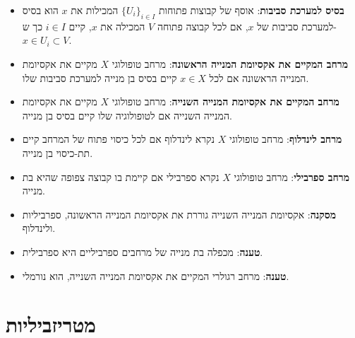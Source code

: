 \documentclass{tstextbook}
\begin{document}
\begin{summary}
  \begin{itemize}
    \item \textbf{בסיס למערכת סביבות}: אוסף של קבוצות פתוחות \(\{U_i\}_{i \in I}\) המכילות את \(x\) הוא בסיס למערכת סביבות של \(x\), אם לכל קבוצה פתוחה \(V\) המכילה את \(x\), קיים \(i \in I\) כך ש-\(x \in U_i \subset V\).
    \item \textbf{מרחב המקיים את אקסיומת המנייה הראשונה}: מרחב טופולוגי \(X\) מקיים את אקסיומת המנייה הראשונה אם לכל \(x \in X\) קיים בסיס בן מנייה למערכת סביבות שלו.
    \item \textbf{מרחב המקיים את אקסיומת המנייה השנייה}: מרחב טופולוגי \(X\) מקיים את אקסיומת המנייה השנייה אם לטופולוגיה שלו קיים בסיס בן מנייה.
    \item \textbf{מרחב לינדלוף}: מרחב טופולוגי \(X\) נקרא לינדלוף אם לכל כיסוי פתוח של המרחב קיים תת-כיסוי בן מנייה.
    \item \textbf{מרחב ספרבילי}: מרחב טופולוגי \(X\) נקרא ספרבילי אם קיימת בו קבוצה צפופה שהיא בת מנייה.
    \item \textbf{מסקנה}: אקסיומת המנייה השנייה גוררת את אקסיומת המנייה הראשונה, ספרביליות ולינדלוף.
    \item \textbf{טענה}: מכפלה בת מנייה של מרחבים ספרביליים היא ספרבילית.
    \item \textbf{טענה}: מרחב רגולרי המקיים את אקסיומת המנייה השנייה, הוא נורמלי.
  \end{itemize}
\end{summary}
\section{מטריזביליות}
\end{document}
